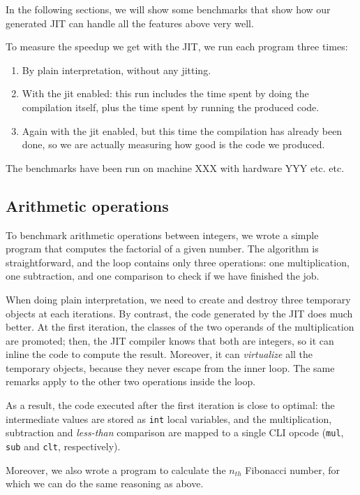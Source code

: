 In the following sections, we will show some benchmarks that show how our
generated JIT can handle all the features above very well.

To measure the speedup we get with the JIT, we run each program three times:

\begin{enumerate}
\item By plain interpretation, without any jitting.
\item With the jit enabled: this run includes the time spent by doing the
  compilation itself, plus the time spent by running the produced code.
\item Again with the jit enabled, but this time the compilation has already
  been done, so we are actually measuring how good is the code we produced.
\end{enumerate}

The benchmarks have been run on machine XXX with hardware YYY etc. etc.

\subsection{Arithmetic operations}

To benchmark arithmetic operations between integers, we wrote a simple program
that computes the factorial of a given number.  The algorithm is
straightforward, and the loop contains only three operations: one
multiplication, one subtraction, and one comparison to check if we have
finished the job.

When doing plain interpretation, we need to create and destroy three temporary
objects at each iterations.  By contrast, the code generated by the JIT does
much better.  At the first iteration, the classes of the two operands of the
multiplication are promoted; then, the JIT compiler knows that both are
integers, so it can inline the code to compute the result.  Moreover, it can
\emph{virtualize} all the temporary objects, because they never escape from
the inner loop.  The same remarks apply to the other two operations inside
the loop.

As a result, the code executed after the first iteration is close to optimal:
the intermediate values are stored as \lstinline{int} local variables, and the
multiplication, subtraction and \emph{less-than} comparison are mapped to a
single CLI opcode (\lstinline{mul}, \lstinline{sub} and \lstinline{clt},
respectively).

Moreover, we also wrote a program to calculate the $n_{th}$ Fibonacci number,
for which we can do the same reasoning as above.

